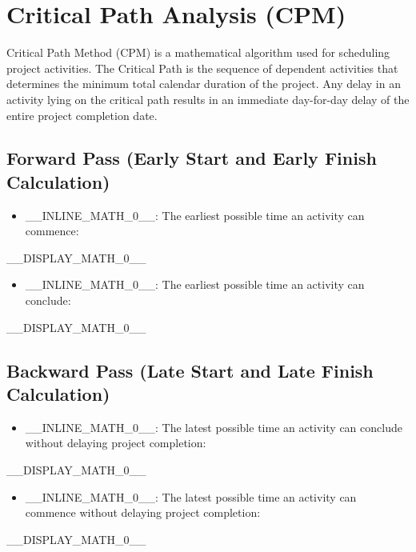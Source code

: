 \section{Critical Path Analysis (CPM)}

Critical Path Method (CPM) is a mathematical algorithm used for scheduling project activities. The Critical Path is the sequence of dependent activities that determines the minimum total calendar duration of the project. Any delay in an activity lying on the critical path results in an immediate day-for-day delay of the entire project completion date.

\subsection{Forward Pass (Early Start and Early Finish Calculation)}

\begin{itemize}
  \item \_\_INLINE\_MATH\_0\_\_: The earliest possible time an activity can commence:
\end{itemize}

\_\_DISPLAY\_MATH\_0\_\_

\begin{itemize}
  \item \_\_INLINE\_MATH\_0\_\_: The earliest possible time an activity can conclude:
\end{itemize}

\_\_DISPLAY\_MATH\_0\_\_

\subsection{Backward Pass (Late Start and Late Finish Calculation)}

\begin{itemize}
  \item \_\_INLINE\_MATH\_0\_\_: The latest possible time an activity can conclude without delaying project completion:
\end{itemize}

\_\_DISPLAY\_MATH\_0\_\_

\begin{itemize}
  \item \_\_INLINE\_MATH\_0\_\_: The latest possible time an activity can commence without delaying project completion:
\end{itemize}

\_\_DISPLAY\_MATH\_0\_\_

